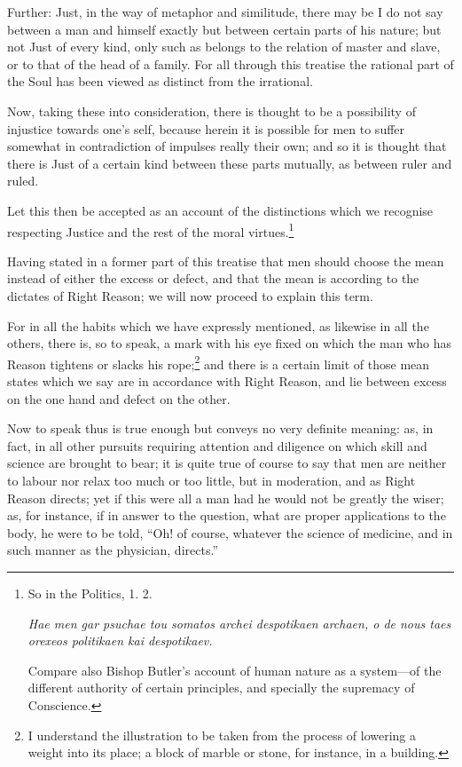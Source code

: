 Further: Just, in the way of metaphor and similitude, there may be I do not say
between a man and himself exactly but between certain parts of his nature; but
not Just of every kind, only such as belongs to the relation of master and
slave, or to that of the head of a family. For all through this treatise the
rational part of the Soul has been viewed as distinct from the irrational.

Now, taking these into consideration, there is thought to be a possibility of
injustice towards one’s self, because herein it is possible for men to
suffer somewhat in contradiction of impulses really their own; and so it is
thought that there is Just of a certain kind between these parts mutually, as
between ruler and ruled.

Let this then be accepted as an account of the distinctions which we recognise
respecting Justice and the rest of the moral
virtues.\footnote{So in the Politics, 1. 2.

\emph{Hae men gar psuchae tou somatos archei despotikaen archaen, o de nous
taes orexeos politikaen kai despotikaev.}

Compare also Bishop Butler’s account of human nature as a
system—of the different authority of certain principles, and specially
the supremacy of Conscience.}



Having stated in a former part of this treatise that men should choose the mean
instead of either the excess or defect, and that the mean is according to the
dictates of Right Reason; we will now proceed to explain this term.

For in all the habits which we have expressly mentioned, as likewise in all the
others, there is, so to speak, a mark with his eye fixed on which the man who
has Reason tightens or slacks his rope;\footnote{I understand the illustration to be taken from the process of lowering a weight
into its place; a block of marble or stone, for instance, in a building.}
and there is a certain limit of those mean states which we say are in
accordance with Right Reason, and lie between excess on the one hand and defect
on the other.

Now to speak thus is true enough but conveys no very definite meaning: as, in
fact, in all other pursuits requiring attention and diligence on which skill
and science are brought to bear; it is quite true of course to say that men are
neither to labour nor relax too much or too little, but in moderation, and as
Right Reason directs; yet if this were all a man had he would not be greatly
the wiser; as, for instance, if in answer to the question, what are proper
applications to the body, he were to be told, “Oh! of course, whatever
the science of medicine, and in such manner as the physician, directs.”

